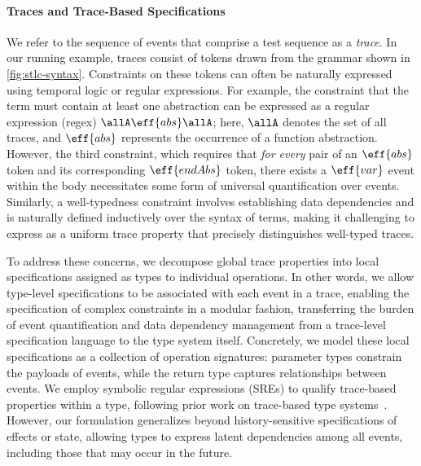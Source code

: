 \paragraph{Traces and Trace-Based Specifications}
We refer to the sequence of events that comprise a test sequence as a
\emph{trace}. In our running example, traces consist of tokens drawn
from the grammar shown in \autoref{fig:stlc-syntax}.  Constraints
on these tokens can often be naturally expressed using temporal logic
or regular expressions. For example, the constraint that the term must
contain at least one abstraction can be expressed as a regular
expression (regex) $\allA \eff{abs} \allA$; here, $\allA$ denotes the
set of all traces, and $\eff{abs}$ represents the occurrence of a
function abstraction.  However, the third constraint, which requires
that \emph{for every} pair of an $\eff{abs}$ token and its
corresponding $\eff{endAbs}$ token, there exists a $\eff{var}$ event
within the body necessitates some form of universal quantification
over events. Similarly, a well-typedness constraint involves
establishing data dependencies and is naturally defined inductively
over the syntax of terms, making it challenging to express as a
uniform trace property that precisely distinguishes well-typed traces.

To address these concerns, we decompose global trace properties into
local specifications assigned as types to individual operations.  In
other words, we allow type-level specifications to be associated with
each event in a trace, enabling the specification of complex
constraints in a modular fashion, transferring the burden of event
quantification and data dependency management from a trace-level
specification language to the type system itself.  Concretely, we
model these local specifications as a collection of operation
signatures: parameter types constrain the payloads of events, while
the return type captures relationships between events. We employ
symbolic regular expressions (SREs) to qualify trace-based properties
within a type, following prior work on trace-based type
systems~\cite{KT+14,ZYDJ24,NUKT+18}. However, our formulation
generalizes beyond history-sensitive specifications of effects or
state, allowing types to express latent dependencies among all events,
including those that may occur in the future.


